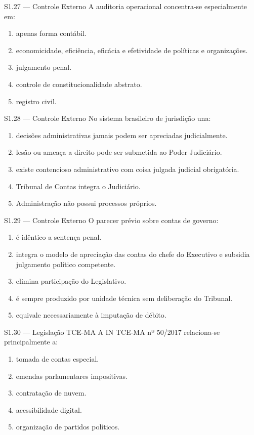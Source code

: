 \begin{questao}{S1.27 — Controle Externo}
A auditoria operacional concentra-se especialmente em:
\begin{enumerate}[label=\Alph*)]
\item apenas forma contábil.
\item economicidade, eficiência, eficácia e efetividade de políticas e organizações.
\item julgamento penal.
\item controle de constitucionalidade abstrato.
\item registro civil.
\end{enumerate}
\end{questao}

\begin{questao}{S1.28 — Controle Externo}
No sistema brasileiro de jurisdição una:
\begin{enumerate}[label=\Alph*)]
\item decisões administrativas jamais podem ser apreciadas judicialmente.
\item lesão ou ameaça a direito pode ser submetida ao Poder Judiciário.
\item existe contencioso administrativo com coisa julgada judicial obrigatória.
\item Tribunal de Contas integra o Judiciário.
\item Administração não possui processos próprios.
\end{enumerate}
\end{questao}

\begin{questao}{S1.29 — Controle Externo}
O parecer prévio sobre contas de governo:
\begin{enumerate}[label=\Alph*)]
\item é idêntico a sentença penal.
\item integra o modelo de apreciação das contas do chefe do Executivo e subsidia julgamento político competente.
\item elimina participação do Legislativo.
\item é sempre produzido por unidade técnica sem deliberação do Tribunal.
\item equivale necessariamente à imputação de débito.
\end{enumerate}
\end{questao}

\begin{questao}{S1.30 — Legislação TCE-MA}
A IN TCE-MA nº 50/2017 relaciona-se principalmente a:
\begin{enumerate}[label=\Alph*)]
\item tomada de contas especial.
\item emendas parlamentares impositivas.
\item contratação de nuvem.
\item acessibilidade digital.
\item organização de partidos políticos.
\end{enumerate}
\end{questao}

